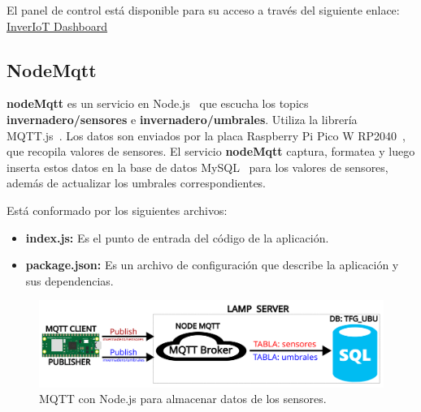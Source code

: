 El panel de control está disponible para su acceso a través del siguiente enlace: \href{http://www.inveriot.com}{InverIoT Dashboard}



\subsection{NodeMqtt}\label{proyecto:NodeMqtt}
\textbf{nodeMqtt} es un servicio en Node.js~\cite{misc:Nodejs} que escucha los topics \textbf{invernadero/sensores} e \textbf{invernadero/umbrales}. Utiliza la librería MQTT.js~\cite{misc:MQTTjs}. Los datos son enviados por la placa Raspberry Pi Pico W RP2040~\cite{misc:RPiPicoW}, que recopila valores de sensores. El servicio \textbf{nodeMqtt} captura, formatea y luego inserta estos datos en la base de datos MySQL~\cite{misc:Mysql} para los valores de sensores, además de actualizar los umbrales correspondientes.

Está conformado por los siguientes archivos:

\begin{itemize}
	\item \textbf{index.js:}
		Es el punto de entrada del código de la aplicación.
	\item \textbf{package.json:}
		Es un archivo de configuración que describe la aplicación y sus dependencias.
\end{itemize}

\begin{figure}[h]
	\centering
	\includegraphics[width=1\textwidth]{img/diagramas/mqtt_nodeMqtt.png}
	\caption{MQTT con Node.js para almacenar datos de los sensores.}
\end{figure}


